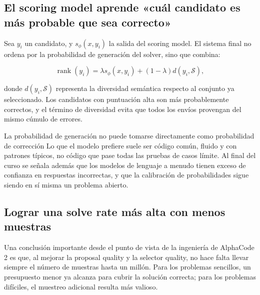 \documentclass[a4paper]{article}
\begin{document}
\subsection{El scoring model aprende «cuál candidato es más probable que sea correcto»}


Sea $y_i$ un candidato, y $s_\phi(x,y_i)$ la salida del scoring model. El sistema final no ordena por la probabilidad de generación del solver, sino que combina:

$$
\operatorname{rank}(y_i)=
\lambda s_\phi(x,y_i)+(1-\lambda)d(y_i,\mathcal S),
$$

donde $d(y_i,\mathcal S)$ representa la diversidad semántica respecto al conjunto ya seleccionado. Los candidatos con puntuación alta son más probablemente correctos, y el término de diversidad evita que todos los envíos provengan del mismo cúmulo de errores.

\begin{warningbox}{La probabilidad de generación no puede tomarse directamente como probabilidad de corrección}
Lo que el modelo prefiere suele ser código común, fluido y con patrones típicos, no código que pase todas las pruebas de casos límite. Al final del curso se señala además que los modelos de lenguaje a menudo tienen exceso de confianza en respuestas incorrectas, y que la calibración de probabilidades sigue siendo en sí misma un problema abierto.
\end{warningbox}


\subsection{Lograr una solve rate más alta con menos muestras}


Una conclusión importante desde el punto de vista de la ingeniería de AlphaCode 2 es que, al mejorar la proposal quality y la selector quality, no hace falta llevar siempre el número de muestras hasta un millón. Para los problemas sencillos, un presupuesto menor ya alcanza para cubrir la solución correcta; para los problemas difíciles, el muestreo adicional resulta más valioso.
\end{document}
